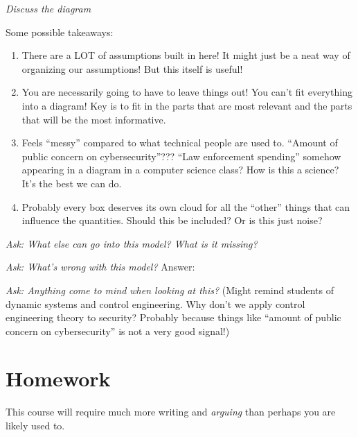 \documentclass[11pt]{article}
\begin{document}
{\it Discuss the diagram}

Some possible takeaways:
\begin{enumerate}
    \item There are a LOT of assumptions built in here! It might just be a neat way of organizing our assumptions! But this itself is useful!
    \item You are necessarily going to have to leave things out! You can't fit everything into a diagram! Key is to fit in the parts that are most relevant and the parts that will be the most informative.
    \item Feels ``messy'' compared to what technical people are used to. ``Amount of public concern on cybersecurity''??? ``Law enforcement spending'' somehow appearing in a diagram in a computer science class? How is this a science? It's the best we can do.
    \item Probably every box deserves its own cloud for all the ``other'' things that can influence the quantities. Should this be included? Or is this just noise?
\end{enumerate}

{\it Ask: What else can go into this model? What is it missing?}

{\it Ask: What's wrong with this model?} Answer: 

{\it Ask: Anything come to mind when looking at this?} (Might remind students of dynamic systems and control engineering. Why don't we apply control engineering theory to security? Probably because things like ``amount of public concern on cybersecurity'' is not a very good signal!)

\section{Homework}

This course will require much more writing and {\it arguing} than perhaps you are likely used to.
\end{document}
